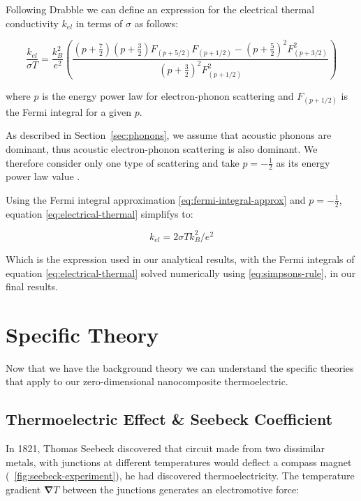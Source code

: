 \documentclass[12pt]{article}
\newcommand{\figref}[2][\figurename~]{#1\ref{#2}}
\newcommand{\secref}[2][Section~]{#1\ref{#2}}
\renewcommand{\vec}[1]{\mathbf{#1}}
\begin{document}
Following Drabble \cite{drabble} we can define an expression for the electrical thermal conductivity $k_{el}$ in terms of $\sigma$ as follows:

\begin{equation}
\label{eq:electrical-thermal}
	\frac{k_{el}}{\sigma T} = \frac{k_B^2}{e^2} \left( \frac{ (p + \frac{7}{2}) (p+\frac{3}{2}) F_{(p + 5/2)} F_{(p + 1/2)} - (p + \frac{5}{2})^2 F_{(p + 3/2)}^2 }{(p + \frac{3}{2})^2 F_{(p + 1/2)}^2} \right)
\end{equation}

where $p$ is the energy power law for electron-phonon scattering and $F_{(p + 1/2)}$ is the Fermi integral for a given $p$.

As described in \secref{sec:phonons}, we assume that acoustic phonons are dominant, thus acoustic electron-phonon scattering is also dominant. We therefore consider only one type of scattering and take $p = -\frac{1}{2}$ as its energy power law value \cite{drabble}.

Using the Fermi integral approximation \eqref{eq:fermi-integral-approx} and $p = -\frac{1}{2}$, equation \eqref{eq:electrical-thermal} simplifys to:

\begin{equation}
\label{eq:electrical-thermal-approx}
	k_{el}= 2\sigma T k_B^2/e^2
\end{equation}

Which is the expression used in our analytical results, with the Fermi integrals of equation \eqref{eq:electrical-thermal} solved numerically using \eqref{eq:simpsons-rule}, in our final results.

\section{Specific Theory}
Now that we have the background theory we can understand the specific theories that apply to our zero-dimensional nanocomposite thermoelectric.

\subsection{Thermoelectric Effect \& Seebeck Coefficient}
\label{sec:thermoelectricity}
In 1821, Thomas Seebeck discovered that circuit made from two dissimilar metals, with junctions at different temperatures would deflect a compass magnet (\figref{fig:seebeck-experiment}), he had discovered thermoelectricity. The temperature gradient $\vec{\nabla} T$ between the junctions generates an electromotive force:
\end{document}
